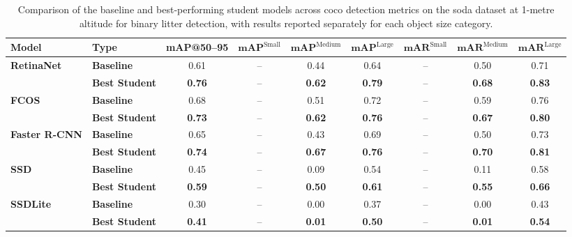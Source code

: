 \begin{table}[htbp]
\centering
\renewcommand{\arraystretch}{1.35} %
\begin{adjustbox}{width=\textwidth}
\begin{tabular}{llccccccc}
\hline
\textbf{Model} & \textbf{Type} & \textbf{mAP@50--95} & \(\mathbf{mAP}^{\text{Small}}\) & \(\mathbf{mAP}^{\text{Medium}}\) & \(\mathbf{mAP}^{\text{Large}}\) & \(\mathbf{mAR}^{\text{Small}}\) & \(\mathbf{mAR}^{\text{Medium}}\) & \(\mathbf{mAR}^{\text{Large}}\) \\ \hline
\multirow{2}{*}{\textbf{RetinaNet}} 
 & \textbf{Baseline}      & 0.61 & --    & 0.44 & 0.64 & --    & 0.50 & 0.71 \\
 & \textbf{Best Student}  & \textbf{0.76} & --    & \textbf{0.62} & \textbf{0.79} & --    & \textbf{0.68} & \textbf{0.83} \\ \hline
\multirow{2}{*}{\textbf{FCOS}} 
 & \textbf{Baseline}      & 0.68 & --    & 0.51 & 0.72 & --    & 0.59 & 0.76 \\
 & \textbf{Best Student}  & \textbf{0.73} & --    & \textbf{0.62} & \textbf{0.76} & --    & \textbf{0.67} & \textbf{0.80} \\ \hline
\multirow{2}{*}{\textbf{Faster R-CNN}} 
 & \textbf{Baseline}      & 0.65 & --    & 0.43 & 0.69 & --    & 0.50 & 0.73 \\
 & \textbf{Best Student}  & \textbf{0.74} & --    & \textbf{0.67} & \textbf{0.76} & --    & \textbf{0.70} & \textbf{0.81} \\ \hline
\multirow{2}{*}{\textbf{SSD}} 
 & \textbf{Baseline}      & 0.45 & --    & 0.09 & 0.54 & --    & 0.11 & 0.58 \\
 & \textbf{Best Student}  & \textbf{0.59} & --    & \textbf{0.50} & \textbf{0.61} & --    & \textbf{0.55} & \textbf{0.66} \\ \hline
\multirow{2}{*}{\textbf{SSDLite}} 
 & \textbf{Baseline}      & 0.30 & --    & 0.00 & 0.37 & --    & 0.00 & 0.43 \\
 & \textbf{Best Student}  & \textbf{0.41} & --    & \textbf{0.01} & \textbf{0.50} & --    & \textbf{0.01} & \textbf{0.54} \\ \hline
\end{tabular}
\end{adjustbox}
\caption{Comparison of the baseline and best‐performing student models across \gls{coco} detection metrics on the \gls{soda} dataset at 1-metre altitude for binary litter detection, with results reported separately for each object size category.}
\label{tab:soda01m_object_sizes_split}
\end{table}

